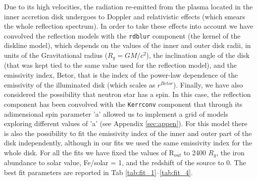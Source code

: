 \documentclass{aa}
\begin{document}
Due to its high velocities, the radiation re-emitted from the plasma 
located in the inner accretion disk undergoes to Doppler and relativistic 
effects (which smears the whole reflection spectrum). In order to take 
these effects into account we have convolved the reflection models
with the \texttt{rdblur} component (the kernel of the diskline model),
which depends on the values of the inner and outer disk radii, in units
of the Gravitational radius ($R_g = G M/c^2$), the inclination angle of the 
disk (that was kept tied to the same value used for the reflection model),
and the emissivity index, Betor, that is the index of the power-law dependence 
of the emissivity of the illuminated disk (which scales as $r^{Betor}$). 
Finally, we have also considered the possibility that neutron star has a 
spin. In this case, the reflection component has been convolved
with the \texttt{Kerrconv} component \citep{Brenneman.etal:06} that through 
its adimensional spin parameter 'a' allowed us to implement a grid of models 
exploring different values of 'a' (see Appendix \ref{sec:appen}). 
For this model there is also the possibility to fit the emissivity 
index of the inner and outer part of the disk independently, although in our 
fits we used the same emissivity index for the whole disk.
For all the fits we have fixed the values of R$_{out}$ to 2400 $R_g$,
the iron abundance to solar value, Fe/solar = 1, and the redshift of the
source to 0. 
The best fit parameters are reported in Tab \ref{tab:fit_1}--\ref{tab:fit_4}.
\end{document}
